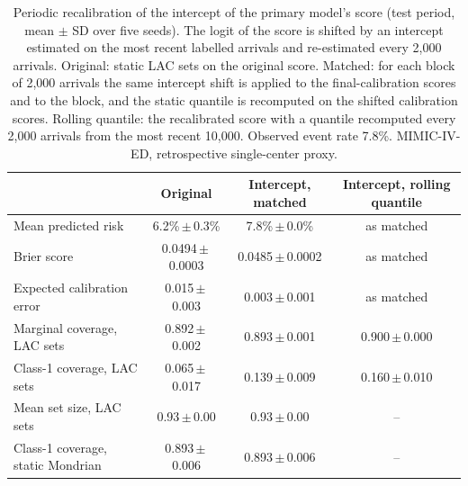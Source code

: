 \begin{table}[t]
\centering
\caption{Periodic recalibration of the intercept of the primary model's score (test period, mean $\pm$ SD over five seeds). The logit of the score is shifted by an intercept estimated on the most recent labelled arrivals and re-estimated every 2{,}000 arrivals. Original: static LAC sets on the original score. Matched: for each block of 2{,}000 arrivals the same intercept shift is applied to the final-calibration scores and to the block, and the static quantile is recomputed on the shifted calibration scores. Rolling quantile: the recalibrated score with a quantile recomputed every 2{,}000 arrivals from the most recent 10{,}000. Observed event rate 7.8\%. MIMIC-IV-ED, retrospective single-center proxy.}
\label{tab:intercept}
\begin{tabular}{lccc}
\toprule
& Original & Intercept, matched & Intercept, rolling quantile \\
\midrule
Mean predicted risk & 6.2\%\,$\pm$\,0.3\% & 7.8\%\,$\pm$\,0.0\% & as matched \\
Brier score & 0.0494\,$\pm$\,0.0003 & 0.0485\,$\pm$\,0.0002 & as matched \\
Expected calibration error & 0.015\,$\pm$\,0.003 & 0.003\,$\pm$\,0.001 & as matched \\
\midrule
Marginal coverage, LAC sets & 0.892\,$\pm$\,0.002 & 0.893\,$\pm$\,0.001 & 0.900\,$\pm$\,0.000 \\
Class-1 coverage, LAC sets & 0.065\,$\pm$\,0.017 & 0.139\,$\pm$\,0.009 & 0.160\,$\pm$\,0.010 \\
Mean set size, LAC sets & 0.93\,$\pm$\,0.00 & 0.93\,$\pm$\,0.00 & -- \\
Class-1 coverage, static Mondrian & 0.893\,$\pm$\,0.006 & 0.893\,$\pm$\,0.006 & -- \\
\bottomrule
\end{tabular}
\end{table}
